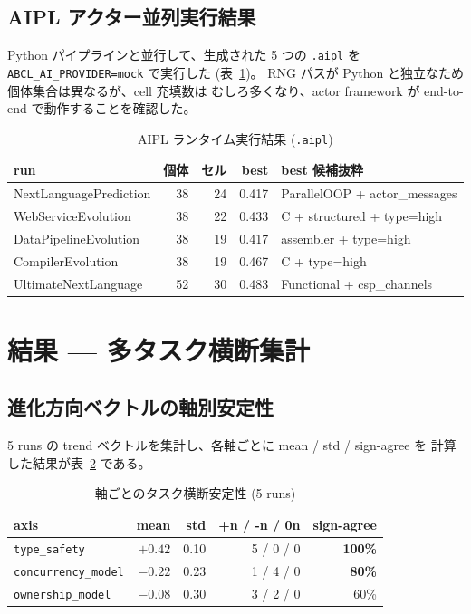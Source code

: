 \documentclass[a4paper,11pt]{article}
\begin{document}
\subsection{AIPL アクター並列実行結果}

Python パイプラインと並行して、生成された 5 つの \texttt{.aipl} を
\texttt{ABCL\_AI\_PROVIDER=mock} で実行した (表~\ref{tab:abcl_results})。
RNG パスが Python と独立なため個体集合は異なるが、cell 充填数は
むしろ多くなり、actor framework が end-to-end で動作することを確認した。

\begin{table}[h]
\centering
\caption{AIPL ランタイム実行結果 (\texttt{.aipl})}
\label{tab:abcl_results}
\small
\begin{tabular}{lrrrl}
\toprule
run & 個体 & セル & best & best 候補抜粋 \\
\midrule
NextLanguagePrediction & 38 & 24 & 0.417 & ParallelOOP + actor\_messages \\
WebServiceEvolution    & 38 & 22 & 0.433 & C + structured + type=high \\
DataPipelineEvolution  & 38 & 19 & 0.417 & assembler + type=high \\
CompilerEvolution      & 38 & 19 & 0.467 & C + type=high \\
UltimateNextLanguage   & 52 & 30 & 0.483 & Functional + csp\_channels \\
\bottomrule
\end{tabular}
\end{table}

\section{結果 — 多タスク横断集計}

\subsection{進化方向ベクトルの軸別安定性}

5 runs の trend ベクトルを集計し、各軸ごとに mean / std / sign-agree を
計算した結果が表~\ref{tab:trend_stability} である。

\begin{table}[h]
\centering
\caption{軸ごとのタスク横断安定性 (5 runs)}
\label{tab:trend_stability}
\small
\begin{tabular}{lrrrr}
\toprule
axis & mean & std & +n / -n / 0n & sign-agree \\
\midrule
\texttt{type\_safety}        & \(+0.42\) & 0.10 & 5 / 0 / 0 & \textbf{100\%} \\
\texttt{concurrency\_model}  & \(-0.22\) & 0.23 & 1 / 4 / 0 & \textbf{80\%} \\
\texttt{ownership\_model}    & \(-0.08\) & 0.30 & 3 / 2 / 0 & 60\% \\
\bottomrule
\end{tabular}
\end{table}
\end{document}
